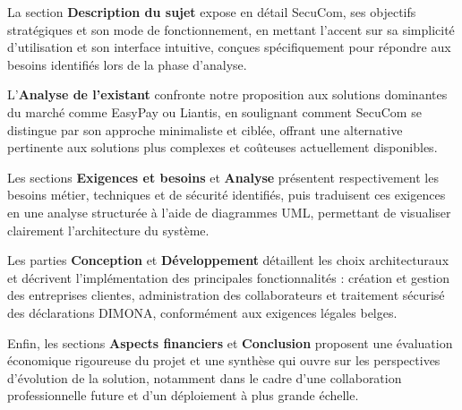 \noindent La section \textbf{Description du sujet} expose en détail SecuCom, ses objectifs stratégiques et son mode de fonctionnement, en mettant l'accent sur sa simplicité d'utilisation et son interface intuitive, conçues spécifiquement pour répondre aux besoins identifiés lors de la phase d'analyse.

\noindent L'\textbf{Analyse de l'existant} confronte notre proposition aux solutions dominantes du marché comme EasyPay ou Liantis, en soulignant comment SecuCom se distingue par son approche minimaliste et ciblée, offrant une alternative pertinente aux solutions plus complexes et coûteuses actuellement disponibles.

\noindent Les sections \textbf{Exigences et besoins} et \textbf{Analyse} présentent respectivement les besoins métier, techniques et de sécurité identifiés, puis traduisent ces exigences en une analyse structurée à l'aide de diagrammes UML, permettant de visualiser clairement l'architecture du système.

\noindent Les parties \textbf{Conception} et \textbf{Développement} détaillent les choix architecturaux et décrivent l'implémentation des principales fonctionnalités : création et gestion des entreprises clientes, administration des collaborateurs et traitement sécurisé des déclarations DIMONA, conformément aux exigences légales belges.

\noindent Enfin, les sections \textbf{Aspects financiers} et \textbf{Conclusion} proposent une évaluation économique rigoureuse du projet et une synthèse qui ouvre sur les perspectives d'évolution de la solution, notamment dans le cadre d'une collaboration professionnelle future et d'un déploiement à plus grande échelle.
